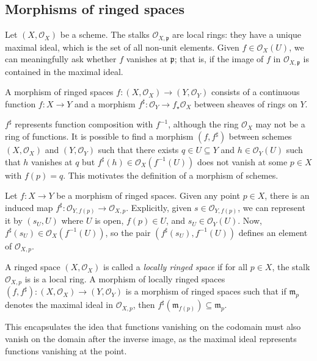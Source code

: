\subsection{Morphisms of ringed spaces}
Let \( (X, \mathcal O_X) \) be a scheme.
The stalks \( \mathcal O_{X,\mathfrak p} \) are local rings: they have a unique maximal ideal, which is the set of all non-unit elements.
Given \( f \in \mathcal O_X(U) \), we can meaningfully ask whether \( f \) vanishes at \( \mathfrak p \); that is, if the image of \( f \) in \( \mathcal O_{X, \mathfrak p} \) is contained in the maximal ideal.
\begin{definition}
    A morphism of ringed spaces \( f : (X, \mathcal O_X) \to (Y, \mathcal O_Y) \) consists of a continuous function \( f : X \to Y \) and a morphism \( f^\sharp : \mathcal O_Y \to f_\star \mathcal O_X \) between sheaves of rings on \( Y \).
\end{definition}
\( f^\sharp \) represents function composition with \( f^{-1} \), although the ring \( \mathcal O_X \) may not be a ring of functions.
It is possible to find a morphism \( (f, f^\sharp) \) between schemes \( (X, \mathcal O_X) \) and \( (Y, \mathcal O_Y) \) such that there exists \( q \in U \subseteq Y \) and \( h \in \mathcal O_Y(U) \) such that \( h \) vanishes at \( q \) but \( f^\sharp(h) \in \mathcal O_X(f^{-1}(U)) \) does not vanish at some \( p \in X \) with \( f(p) = q \).
This motivates the definition of a morphism of schemes.

Let \( f : X \to Y \) be a morphism of ringed spaces.
Given any point \( p \in X \), there is an induced map \( f^\sharp : \mathcal O_{Y,f(p)} \to \mathcal O_{X,p} \).
Explicitly, given \( s \in \mathcal O_{Y,f(p)} \), we can represent it by \( (s_U, U) \) where \( U \) is open, \( f(p) \in U \), and \( s_U \in \mathcal O_Y(U) \).
Now, \( f^\sharp(s_U) \in \mathcal O_X(f^{-1}(U)) \), so the pair \( (f^\sharp(s_U), f^{-1}(U)) \) defines an element of \( \mathcal O_{X,p} \).
\begin{definition}
    A ringed space \( (X, \mathcal O_X) \) is called a \emph{locally ringed space} if for all \( p \in X \), the stalk \( \mathcal O_{X,p} \) is is a local ring.
    A morphism of locally ringed spaces \( (f, f^\sharp) : (X, \mathcal O_X) \to (Y, \mathcal O_Y) \) is a morphism of ringed spaces such that if \( \mathfrak m_p \) denotes the maximal ideal in \( \mathcal O_{X,p} \), then \( f^\sharp(\mathfrak m_{f(p)}) \subseteq \mathfrak m_p \).
\end{definition}
This encapsulates the idea that functions vanishing on the codomain must also vanish on the domain after the inverse image, as the maximal ideal represents functions vanishing at the point.

